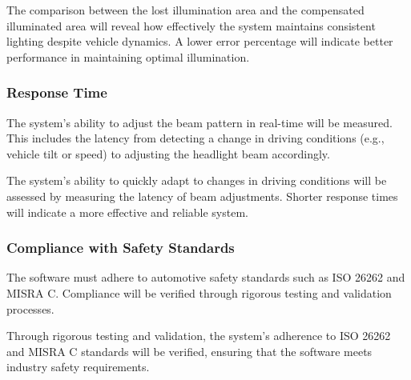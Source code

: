  The comparison between the lost illumination area and the compensated illuminated area will reveal how effectively the system maintains consistent lighting despite vehicle dynamics. A lower error percentage will indicate better performance in maintaining optimal illumination.

\subsubsection{Response Time}
The system's ability to adjust the beam pattern in real-time will be measured. This includes the latency from detecting a change in driving conditions (e.g., vehicle tilt or speed) to adjusting the headlight beam accordingly.

The system's ability to quickly adapt to changes in driving conditions will be assessed by measuring the latency of beam adjustments. Shorter response times will indicate a more effective and reliable system.

\subsubsection{Compliance with Safety Standards}
The software must adhere to automotive safety standards such as ISO 26262 and MISRA C. Compliance will be verified through rigorous testing and validation processes.

Through rigorous testing and validation, the system's adherence to ISO 26262 and MISRA C standards will be verified, ensuring that the software meets industry safety requirements.




